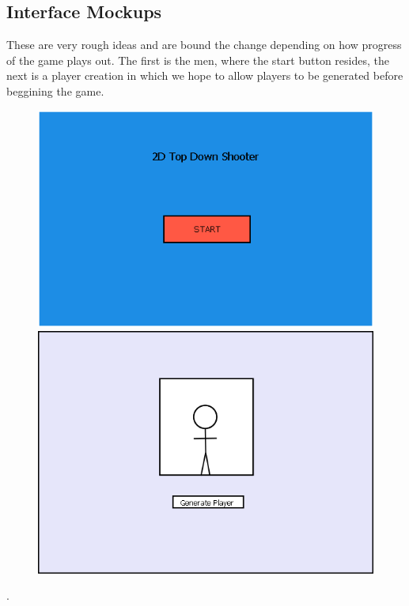 \documentclass[10pt,conference,onecolumn,compsoc]{IEEEtran}
\begin{document}
\subsection{Interface Mockups}
These are very rough ideas and are bound the change depending on how progress of the game plays out. The first is the men, where the start button resides, the next is a player creation in which we hope to allow players to be generated before beggining the game.
\begin{figure}[ht!]
\includegraphics[scale=.25]{Start.png}
\includegraphics[scale=.25]{Player.png}
\caption{}
\label{UML}
\end{figure}


.\\\\\\\\\\\\
\end{document}
